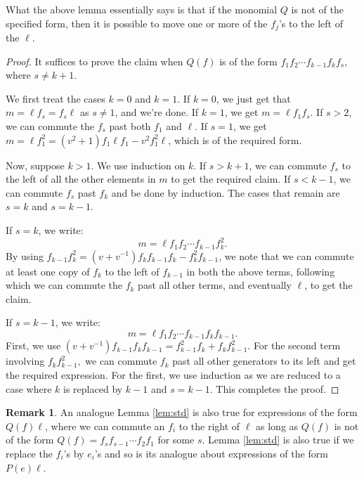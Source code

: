 \documentclass{amsart}
\numberwithin{equation}{section}
\theoremstyle{theorem}
\theoremstyle{definition}
\newtheorem{remark}[theorem]{Remark}
\begin{document}
What the above lemma essentially says is that if the monomial $Q$ is not of the specified form, then it is possible to move one or more of the $f_j$'s to the left of the $\ell$.

\begin{proof}
It suffices to prove the claim when $Q(f)$ is of the form $f_1  f_2 \cdots f_{k-1} f_k f_s$, where $s\neq k+1$.

We first treat the cases $k=0$ and $k=1$. If $k=0$, we just get that $m= \ell f_s= f_s \ell$ as $s\neq 1$, and we're done. If $k=1$, we get $m=\ell f_1f_s$. If $s>2$, we can commute the $f_s$ past both $f_1$ and $\ell$. If $s=1$, we get $m=\ell f_1^2 = (v^2+1)f_1 \ell f_1 - v^2 f_1^2\ell$, which is of the required form.

Now, suppose $k>1$. We use induction on $k$. If $s>k+1$, we can commute $f_s$ to the left of all the other elements in $m$ to get the required claim. If $s<k-1$, we can commute $f_s$ past $f_k$ and be done by induction. The cases that remain are $s=k$ and $s=k-1$.

If $s=k$, we write:
\[m=\ell f_1 f_{2}\cdots f_{k-1} f_k^2.\]
By using $f_{k-1} f_{k}^2 = (v+v^{-1})f_kf_{k-1} f_k - f_k^2f_{k-1}$, we note that we can commute at least one copy of $f_k$ to the left of $f_{k-1}$ in both the above terms, following which we can commute the $f_k$ past all other terms, and eventually $\ell$, to get the claim. 

If $s=k-1$, we write:
\[m=\ell f_{1} f_2\cdots f_{k-1}f_k f_{k-1}.\]
First, we use $(v+v^{-1})f_{k-1}f_k f_{k-1} = f_{k-1}^2 f_k + f_{k}f_{k-1}^2$. For the second term involving $f_k f_{k-1}^2,$ we can commute $f_k$ past all other generators to its left and get the required expression. For the first, we use induction as we are reduced to a case where $k$ is replaced by $k-1$ and $s=k-1$. This completes the proof.
\end{proof}
\begin{remark}
    An analogue Lemma \ref{lem:std} is also true for expressions of the form $Q(f) \ell$, where we can commute an $f_i$ to the right of $\ell$ as long as $Q(f)$ is not of the form $Q(f)=f_s f_{s-1}\cdots f_2 f_1$ for some $s$. %
    Lemma \ref{lem:std} is also true if we replace the $f_i$'s by $e_i$'s and so is its analogue about expressions of the form $P(e)\ell$.
\end{remark}
\end{document}
